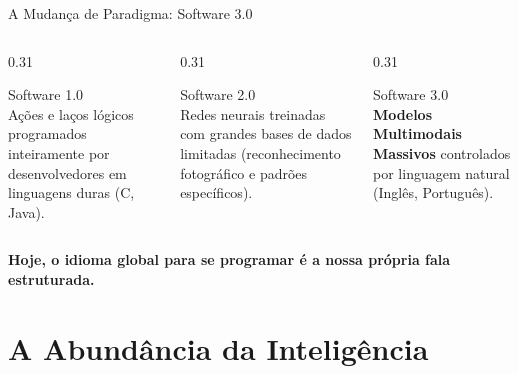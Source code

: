\documentclass[aspectratio=169,12pt]{beamer}
\begin{document}
\begin{frame}{A Mudança de Paradigma: Software 3.0}
     \begin{columns}[T]
        \begin{column}{0.31\textwidth}
            \begin{block}{Software 1.0}
                \faCode\\
                Ações e laços lógicos programados inteiramente por desenvolvedores em linguagens duras (C, Java).
            \end{block}
        \end{column}
        \begin{column}{0.31\textwidth}
            \begin{block}{Software 2.0}
                \faSitemap\\
                Redes neurais treinadas com grandes bases de dados limitadas (reconhecimento fotográfico e padrões específicos).
            \end{block}
        \end{column}
        \begin{column}{0.31\textwidth}
            \begin{exampleblock}{Software 3.0}
                \faComments\\
                \textbf{Modelos Multimodais Massivos} controlados por linguagem natural (Inglês, Português).
            \end{exampleblock}
        \end{column}
    \end{columns}
    
    \vspace{0.5cm}
    \begin{center}
        \textbf{Hoje, o idioma global para se programar é a nossa própria fala estruturada.}
    \end{center}
\end{frame}


\section{A Abundância da Inteligência}
\end{document}
